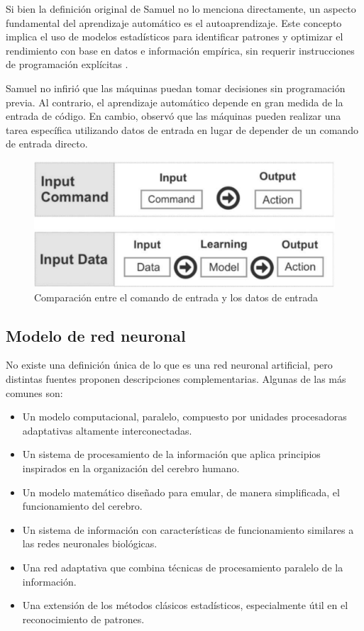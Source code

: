 Si bien la definición original de Samuel no lo menciona directamente, un aspecto fundamental del aprendizaje automático es el autoaprendizaje. Este concepto implica el uso de modelos estadísticos para identificar patrones y optimizar el rendimiento con base en datos e información empírica, sin requerir instrucciones de programación explícitas \cite{Theobald2024}.

Samuel no infirió que las máquinas puedan tomar decisiones sin programación previa. Al contrario, el aprendizaje automático depende en gran medida de la entrada de código. En cambio, observó que las máquinas pueden realizar una tarea específica utilizando datos de entrada en lugar de depender de un comando de entrada directo.

\begin{figure}[H]
    \centering
    \includegraphics[scale=0.5]{figuras/ML.pdf}
    \caption{Comparación entre el comando de entrada y los datos de entrada}
    \label{fig:ML}
\end{figure}



\subsection{Modelo de red neuronal}

No existe una definición única de lo que es una red neuronal artificial, pero distintas fuentes proponen descripciones complementarias. Algunas de las más comunes son:

\begin{itemize}
    \item Un modelo computacional, paralelo, compuesto por unidades procesadoras adaptativas altamente interconectadas.
    \item Un sistema de procesamiento de la información que aplica principios inspirados en la organización del cerebro humano.
    \item Un modelo matemático diseñado para emular, de manera simplificada, el funcionamiento del cerebro.
    \item Un sistema de información con características de funcionamiento similares a las redes neuronales biológicas.
    \item Una red adaptativa que combina técnicas de procesamiento paralelo de la información.
    \item Una extensión de los métodos clásicos estadísticos, especialmente útil en el reconocimiento de patrones.
\end{itemize}

